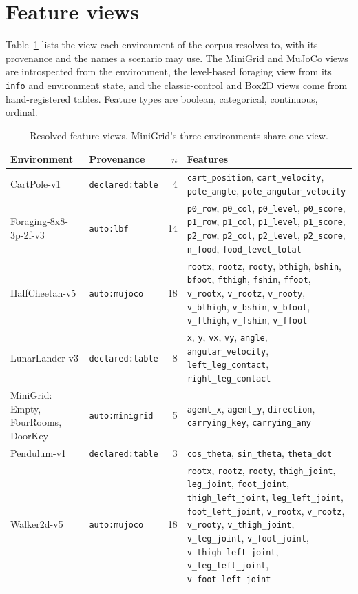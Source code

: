 \section{Feature views}
\label{app:views}

Table~\ref{tab:views} lists the view each environment of the corpus resolves to, with its provenance and the names a scenario may use. The MiniGrid and MuJoCo views are introspected from the environment, the level-based foraging view from its \texttt{info} and environment state, and the classic-control and Box2D views come from hand-registered tables. Feature types are boolean, categorical, continuous, ordinal.

\begin{table}[h]\centering\footnotesize
\caption{Resolved feature views. MiniGrid's three environments share one view.}
\label{tab:views}
\begin{tabular}{@{}>{\raggedright\arraybackslash}p{2.5cm}lr>{\raggedright\arraybackslash}p{6.4cm}@{}}\toprule
Environment & Provenance & $n$ & Features \\ \midrule
CartPole-v1 & \texttt{declared:table} & 4 & \texttt{cart\_position}, \texttt{cart\_velocity}, \texttt{pole\_angle}, \texttt{pole\_angular\_velocity} \\
Foraging-8x8-3p-2f-v3 & \texttt{auto:lbf} & 14 & \texttt{p0\_row}, \texttt{p0\_col}, \texttt{p0\_level}, \texttt{p0\_score}, \texttt{p1\_row}, \texttt{p1\_col}, \texttt{p1\_level}, \texttt{p1\_score}, \texttt{p2\_row}, \texttt{p2\_col}, \texttt{p2\_level}, \texttt{p2\_score}, \texttt{n\_food}, \texttt{food\_level\_total} \\
HalfCheetah-v5 & \texttt{auto:mujoco} & 18 & \texttt{rootx}, \texttt{rootz}, \texttt{rooty}, \texttt{bthigh}, \texttt{bshin}, \texttt{bfoot}, \texttt{fthigh}, \texttt{fshin}, \texttt{ffoot}, \texttt{v\_rootx}, \texttt{v\_rootz}, \texttt{v\_rooty}, \texttt{v\_bthigh}, \texttt{v\_bshin}, \texttt{v\_bfoot}, \texttt{v\_fthigh}, \texttt{v\_fshin}, \texttt{v\_ffoot} \\
LunarLander-v3 & \texttt{declared:table} & 8 & \texttt{x}, \texttt{y}, \texttt{vx}, \texttt{vy}, \texttt{angle}, \texttt{angular\_velocity}, \texttt{left\_leg\_contact}, \texttt{right\_leg\_contact} \\
MiniGrid: Empty, FourRooms, DoorKey & \texttt{auto:minigrid} & 5 & \texttt{agent\_x}, \texttt{agent\_y}, \texttt{direction}, \texttt{carrying\_key}, \texttt{carrying\_any} \\
Pendulum-v1 & \texttt{declared:table} & 3 & \texttt{cos\_theta}, \texttt{sin\_theta}, \texttt{theta\_dot} \\
Walker2d-v5 & \texttt{auto:mujoco} & 18 & \texttt{rootx}, \texttt{rootz}, \texttt{rooty}, \texttt{thigh\_joint}, \texttt{leg\_joint}, \texttt{foot\_joint}, \texttt{thigh\_left\_joint}, \texttt{leg\_left\_joint}, \texttt{foot\_left\_joint}, \texttt{v\_rootx}, \texttt{v\_rootz}, \texttt{v\_rooty}, \texttt{v\_thigh\_joint}, \texttt{v\_leg\_joint}, \texttt{v\_foot\_joint}, \texttt{v\_thigh\_left\_joint}, \texttt{v\_leg\_left\_joint}, \texttt{v\_foot\_left\_joint} \\
\bottomrule\end{tabular}\end{table}

